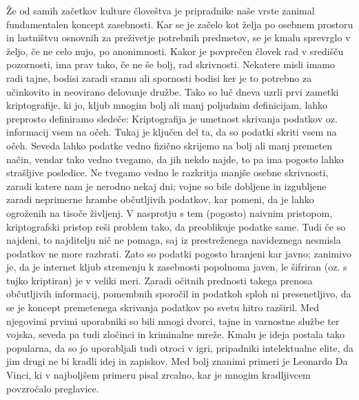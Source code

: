 \documentclass[a4paper, 12pt]{article} %
\begin{document}
Že od samih začetkov kulture človeštva je pripradnike naše vrste zanimal fundamentalen koncept zasebnosti. Kar se je začelo kot želja po osebnem prostoru in lastništvu osnovnih za preživetje potrebnih predmetov, se je kmalu sprevrglo v željo, če ne celo nujo, po anonimnosti. Kakor je povprečen človek rad v središču pozornosti, ima prav tako, če ne še bolj, rad skrivnosti. Nekatere misli imamo radi tajne, bodisi zaradi sramu ali spornosti bodisi ker je to potrebno za učinkovito in neovirano delovanje družbe.
\newline
\newline
Tako so luč dneva uzrli prvi zametki kriptografije, ki jo, kljub mnogim bolj ali manj poljudnim definicijam, lahko preprosto definiramo sledeče:
\newline
Kriptografija je umetnost skrivanja podatkov oz. informacij vsem na očeh.
\newline
\newline
Tukaj je ključen del ta, da so podatki skriti vsem na očeh. Seveda lahko podatke vedno fizično skrijemo na bolj ali manj premeten način, vendar tako vedno tvegamo, da jih nekdo najde, to pa ima pogosto lahko strašljive posledice. Ne tvegamo vedno le razkritja manjše osebne skrivnosti, zaradi katere nam je nerodno nekaj dni; vojne so bile dobljene in izgubljene zaradi neprimerne hrambe občutljivih podatkov, kar pomeni, da je lahko ogroženih na tisoče življenj.
\newline
\newline
V nasprotju s tem (pogosto) naivnim pristopom, kriptografski pristop reši problem tako, da preoblikuje podatke same. Tudi če so najdeni, to najditelju nič ne pomaga, saj iz prestreženega navideznega nesmisla podatkov ne more razbrati. Zato so podatki pogosto hranjeni kar javno; zanimivo je, da je internet kljub stremenju k zasebnosti popolnoma javen, le šifriran (oz. s tujko kriptiran) je v veliki meri.
\newline
\newline
Zaradi očitnih prednosti takega prenosa občutljivih informacij, pomembnih sporočil in podatkoh sploh ni presenetljivo, da se je koncept premetenega skrivanja podatkov po svetu hitro razširil. Med njegovimi prvimi uporabniki so bili mnogi dvorci, tajne in varnostne službe ter vojska, seveda pa tudi zločinci in kriminalne mreže. Kmalu je ideja postala tako popularna, da so jo uporabljali tudi otroci v igri, pripadniki intelektualne elite, da jim drugi ne bi kradli idej in zapiskov. Med bolj znanimi primeri je Leonardo Da Vinci, ki v najboljšem primeru pisal zrcalno, kar je mnogim kradljivcem povzročalo preglavice.
\end{document}

